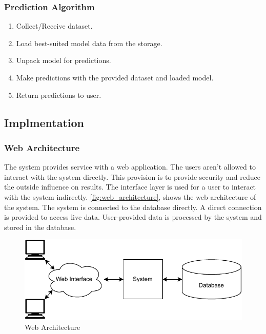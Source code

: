 \vspace{-0.5em}
\subsubsection*{Prediction Algorithm}\label{subsubsec:prediction_algorithm}
\vspace{0.5em}
\begin{enumerate}
    \item Collect/Receive dataset.
    \item Load best-suited model data from the storage.
    \item Unpack model for predictions.
    \item Make predictions with the provided dataset and loaded model.
    \item Return predictions to user.
\end{enumerate}

\subsection{Implmentation}\label{subsec:implmentation}

\subsubsection{Web Architecture}\label{subsubsec:web_architecture}

The system provides service with a web application. The users aren't allowed to interact with the system directly. This provision is to provide security and reduce the outside influence on results. The interface layer is used for a user to interact with the system indirectly. \autoref{fig:web_architecture}, shows the web architecture of the system. The system is connected to the database directly. A direct connection is provided to access live data. User-provided data is processed by the system and stored in the database.

\begin{figure}[ht]
    \centering
    \includegraphics[width=0.9\columnwidth]{media/sec03/web_architecture.pdf}
    \caption{Web Architecture}
    \label{fig:web_architecture}
\end{figure}

